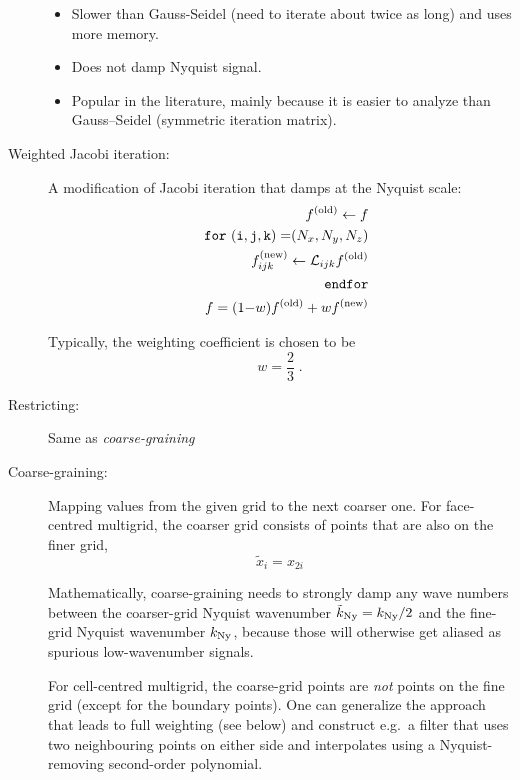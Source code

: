 \documentclass[\mydriver,12pt,twoside,notitlepage,letterpaper]{article}
\begin{document}
\begin{description}
\begin{itemize}
\item Slower than Gauss-Seidel (need to iterate about twice as long) and uses
  more memory.
\item Does not damp Nyquist signal.
\item Popular in the literature, mainly because it is easier to analyze
  than Gauss--Seidel (symmetric iteration matrix).
\end{itemize}

\item[Weighted Jacobi iteration:]
  A modification of Jacobi iteration that damps at the Nyquist scale:
  \begin{eqnarray}
    \label{Eq-weighted-Jacobi}
    && f^{\rm(old)} \leftarrow f \nonumber\\
    && \mathtt{for\ (i,j,k)=}(N_x,N_y,N_z) \nonumber\\
    && \quad f^{\rm(new)}_{ijk} \leftarrow \mathcal{L}_{ijk} f^{\rm(old)} \\
    && \mathtt{endfor} \nonumber\\
    && f = (1{-}w) f^{\rm(old)} + w f^{\rm(new)} \nonumber
  \end{eqnarray}

  Typically, the weighting coefficient is chosen to be
  \begin{equation}
    w = \dfrac{2}{3} \; .
  \end{equation}

\item[Restricting:] Same as \emph{coarse-graining}
\item[Coarse-graining:]
  Mapping values from the given grid to the next coarser one. For
  face-centred multigrid, the coarser grid consists of points that are
  also on the finer grid,
  \begin{equation}
    \tilde{x}_i = x_{2i}
  \end{equation}

  Mathematically, coarse-graining needs to strongly damp any wave numbers
  between the coarser-grid Nyquist wavenumber
  $\tilde{k}_{\rm Ny}=k_{\rm Ny}/2$ and the fine-grid Nyquist wavenumber
  $k_{\rm Ny}$, because those will otherwise get aliased as spurious
  low-wavenumber signals.

  For cell-centred multigrid, the coarse-grid points are \emph{not} points
  on the fine grid (except for the boundary points).
  One can generalize the approach that leads to full weighting (see
  below) and construct e.g.~a filter that uses two neighbouring points on
  either side and interpolates using a Nyquist-removing second-order
  polynomial.


\end{description}
\end{document}
